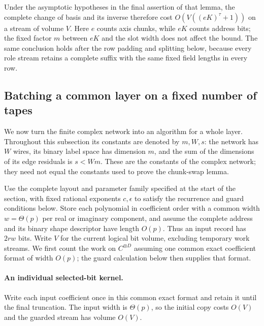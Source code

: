 Under the asymptotic hypotheses in the final assertion of that lemma,
the complete change of basis and its inverse therefore cost
$O(V((eK)^\tau+1))$ on a stream of volume $V$.  Here $e$ counts
axis chunks, while $eK$ counts address bits; the fixed factor $m$
between $eK$ and the slot width does not affect the bound.  The same
conclusion holds after the row padding and splitting below, because
every role stream retains a complete suffix with the same fixed field
lengths in every row.

\subsection{Batching a common layer on a fixed number of tapes}

We now turn the finite complex network into an algorithm for a whole
layer.  Throughout this subsection its constants are denoted by
\(m,W,s\): the network has \(W\) wires, its binary label space has
dimension \(m\), and the sum of the dimensions of its edge residuals is
\(s<Wm\).  These are the constants of the complex network; they need not
equal the constants used to prove the chunk-swap lemma.

Use the complete layout and parameter family specified at the start of
the section, with fixed rational exponents \(c,\epsilon\) to satisfy
the recurrence and guard conditions below. Store each polynomial in
coefficient order with a common width \(w=\Theta(p)\) per real or
imaginary component, and assume the complete address and its binary
shape descriptor have length \(O(p)\). Thus an input record has
\(2rw\) bits. Write \(V\) for the current logical bit volume, excluding
temporary work streams. We first count the work on \(C^{\otimes D}\)
assuming one common exact coefficient format of width \(O(p)\); the
guard calculation below then supplies that format.

\paragraph{An individual selected-bit kernel.}
Write each input coefficient once in this common exact format and retain it until
the final truncation.  The input width is \(\Theta(p)\), so the
initial copy costs \(O(V)\) and the guarded stream has volume \(O(V)\).


